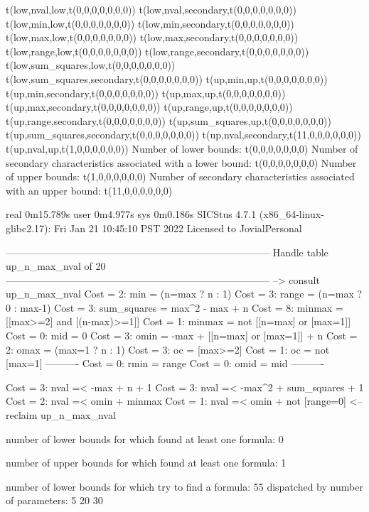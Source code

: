 t(low,nval,low,t(0,0,0,0,0,0,0))
t(low,nval,secondary,t(0,0,0,0,0,0,0))
t(low,min,low,t(0,0,0,0,0,0,0))
t(low,min,secondary,t(0,0,0,0,0,0,0))
t(low,max,low,t(0,0,0,0,0,0,0))
t(low,max,secondary,t(0,0,0,0,0,0,0))
t(low,range,low,t(0,0,0,0,0,0,0))
t(low,range,secondary,t(0,0,0,0,0,0,0))
t(low,sum_squares,low,t(0,0,0,0,0,0,0))
t(low,sum_squares,secondary,t(0,0,0,0,0,0,0))
t(up,min,up,t(0,0,0,0,0,0,0))
t(up,min,secondary,t(0,0,0,0,0,0,0))
t(up,max,up,t(0,0,0,0,0,0,0))
t(up,max,secondary,t(0,0,0,0,0,0,0))
t(up,range,up,t(0,0,0,0,0,0,0))
t(up,range,secondary,t(0,0,0,0,0,0,0))
t(up,sum_squares,up,t(0,0,0,0,0,0,0))
t(up,sum_squares,secondary,t(0,0,0,0,0,0,0))
t(up,nval,secondary,t(11,0,0,0,0,0,0))
t(up,nval,up,t(1,0,0,0,0,0,0))
Number of lower bounds:                                             t(0,0,0,0,0,0,0)
Number of secondary characteristics associated with a lower bound:  t(0,0,0,0,0,0,0)
Number of upper bounds:                                             t(1,0,0,0,0,0,0)
Number of secondary characteristics associated with an upper bound: t(11,0,0,0,0,0,0)

real	0m15.789s
user	0m4.977s
sys	0m0.186s
SICStus 4.7.1 (x86_64-linux-glibc2.17): Fri Jan 21 10:45:10 PST 2022
Licensed to JovialPersonal


--------------------------------------------------------------------------------
Handle table up_n_max_nval of 20
--------------------------------------------------------------------------------
--> consult up_n_max_nval
Cost =  2:  min         = (n=max ? n : 1)
Cost =  3:  range       = (n=max ? 0 : max-1)
Cost =  3:  sum_squares = max^2 - max + n
Cost =  8:  minmax      = [[max>=2] and [(n-max)>=1]]
Cost =  1:  minmax      = not [[n=max] or [max=1]]
Cost =  0:  mid         = 0
Cost =  3:  omin        = -max + [[n=max] or [max=1]] + n %
Cost =  2:  omax        = (max=1 ? n : 1)
Cost =  3:  oc          = [max>=2]
Cost =  1:  oc          = not [max=1]
----------
Cost =  0:  rmin        = range
Cost =  0:  omid        = mid
----------

Cost =  3:  nval =< -max + n + 1
Cost =  3:  nval =< -max^2 + sum_squares + 1
Cost =  2:  nval =< omin + minmax
Cost =  1:  nval =< omin + not [range=0] %
<-- reclaim up_n_max_nval

number of lower bounds for which found at least one formula: 0

number of upper bounds for which found at least one formula: 1

number of lower bounds for which try to find a formula: 55
dispatched by number of parameters: 5  20  30


